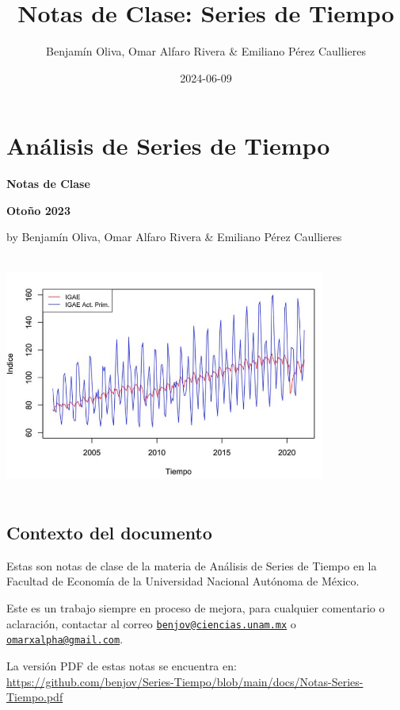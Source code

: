 \documentclass[
]{book}
\title{Notas de Clase: Series de Tiempo}
\author{Benjamín Oliva, Omar Alfaro Rivera \& Emiliano Pérez Caullieres}
\date{2024-06-09}
\begin{document}
\maketitle

{
\setcounter{tocdepth}{1}
\tableofcontents
}
\hypertarget{anuxe1lisis-de-series-de-tiempo}{%
\chapter*{Análisis de Series de Tiempo}\label{anuxe1lisis-de-series-de-tiempo}}

\textbf{Notas de Clase}

\textbf{Otoño 2023}

by Benjamín Oliva, Omar Alfaro Rivera \& Emiliano Pérez Caullieres

\includegraphics[width=4.16667in,height=3.125in]{Portada.png}

\hypertarget{contexto-del-documento}{%
\section*{Contexto del documento}\label{contexto-del-documento}}

Estas son notas de clase de la materia de Análisis de Series de Tiempo en la Facultad de Economía de la Universidad Nacional Autónoma de México.

Este es un trabajo siempre en proceso de mejora, para cualquier comentario o aclaración, contactar al correo \href{mailto:benjov@ciencias.unam.mx}{\nolinkurl{benjov@ciencias.unam.mx}} o \href{mailto:omarxalpha@gmail.com}{\nolinkurl{omarxalpha@gmail.com}}.

La versión PDF de estas notas se encuentra en: \url{https://github.com/benjov/Series-Tiempo/blob/main/docs/Notas-Series-Tiempo.pdf}
\end{document}
